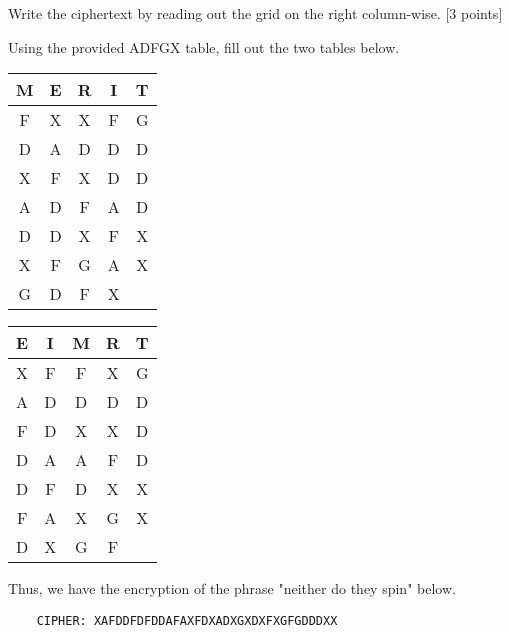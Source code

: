 \documentclass[../hw_sols.tex]{subfiles}
\begin{document}
\noindent Write the ciphertext by reading out the grid on the right column-wise. [3 points]


\begin{solution}
Using the provided ADFGX table, fill out the two tables below.
\begin{center}
	\begin{tabular}{ || c | c | c | c | c || }
		\hline
		\textbf{M} & \textbf{E} & \textbf{R} & \textbf{I} & \textbf{T} \\
		\hline
		F & X & X & F & G \\
		\hline
		D & A & D & D & D \\
		\hline
	    X & F & X & D & D \\
	    \hline
		A & D & F & A & D \\
		\hline
		D & D & X & F & X \\
		\hline
		X & F & G & A & X \\
		\hline
		G & D & F & X & \\
		\hline
	\end{tabular}
	\qquad {\Huge $\Rightarrow$} \qquad
	\begin{tabular}{ || c | c | c | c | c || }
		\hline
		\textbf{E} & \textbf{I} & \textbf{M} & \textbf{R} & \textbf{T} \\
		\hline
		X & F & F & X & G \\
		\hline
		A & D & D & D & D \\
		\hline
		F & D & X & X & D \\
		\hline
		D & A & A & F & D \\
		\hline
		D & F & D & X & X \\
		\hline
		F & A & X & G & X \\
		\hline
		D & X & G & F & \\
		\hline
	\end{tabular}
\end{center}
Thus, we have the encryption of the phrase "neither do they spin" below.

	\begin{verbatim}
    CIPHER: XAFDDFDFDDAFAXFDXADXGXDXFXGFGDDDXX
	\end{verbatim}

\end{solution}


\newpage


\end{document}
